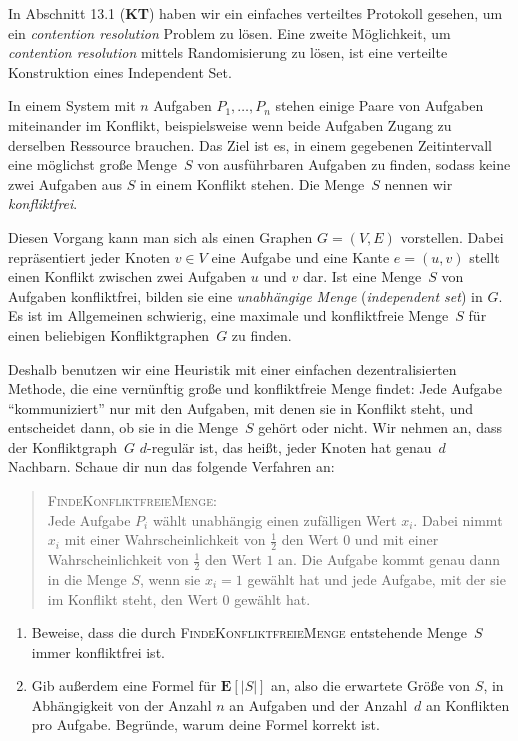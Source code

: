 \documentclass{uebung_cs}
\begin{document}
\begin{exercise}
	In Abschnitt 13.1 (\textbf{KT}) haben wir ein einfaches verteiltes Protokoll gesehen, um ein \textit{contention resolution} Problem zu lösen. Eine zweite Möglichkeit, um \textit{contention resolution} mittels Randomisierung zu lösen, ist eine verteilte Konstruktion eines Independent Set.

	In einem System mit $n$ Aufgaben $P_1,\dots,P_n$ stehen einige Paare von Aufgaben miteinander im Konflikt, beispielsweise wenn beide Aufgaben Zugang zu derselben Ressource brauchen. Das Ziel ist es, in einem gegebenen Zeitintervall eine möglichst große Menge~$S$ von ausführbaren Aufgaben zu finden, sodass keine zwei Aufgaben aus $S$ in einem Konflikt stehen. Die Menge~$S$ nennen wir \textit{konfliktfrei}.
	
	Diesen Vorgang kann man sich als einen Graphen $G = (V,E)$ vorstellen. Dabei repräsentiert jeder Knoten $v \in V$ eine Aufgabe und eine Kante $e = (u,v)$ stellt einen Konflikt zwischen zwei Aufgaben $u$ und $v$ dar. Ist eine Menge~$S$ von Aufgaben konfliktfrei, bilden sie eine \emph{unabhängige Menge} (\emph{independent set}) in $G$. 
	Es ist im Allgemeinen schwierig, eine maximale und konfliktfreie Menge~$S$ für einen beliebigen Konfliktgraphen~$G$ zu finden.
	
	Deshalb benutzen wir eine Heuristik mit einer einfachen dezentralisierten Methode, die eine vernünftig große und konfliktfreie Menge findet: Jede Aufgabe \enquote{kommuniziert} nur mit den Aufgaben, mit denen sie in Konflikt steht, und entscheidet dann, ob sie in die Menge~$S$ gehört oder nicht.
	Wir nehmen an, dass der Konfliktgraph~$G$ $d$-regulär ist, das heißt, jeder Knoten hat genau~$d$ Nachbarn. Schaue dir nun das folgende Verfahren an:
	
	\begin{quote}
		\textsc{FindeKonfliktfreieMenge}: \\
		Jede Aufgabe $P_i$ wählt unabhängig einen zufälligen Wert $x_i$. Dabei nimmt $x_i$ mit einer Wahrscheinlichkeit von $\frac{1}{2}$ den Wert $0$ und mit einer Wahrscheinlichkeit von $\frac{1}{2}$ den Wert $1$ an. Die Aufgabe kommt genau dann in die Menge $S$, wenn sie $x_i = 1$ gewählt hat und jede Aufgabe, mit der sie im Konflikt steht, den Wert $0$ gewählt hat.
	\end{quote}
	
		\begin{enumerate}
		\item\medium Beweise, dass die durch \textsc{FindeKonfliktfreieMenge} entstehende Menge~$S$ immer konfliktfrei ist.
		\item\hard Gib außerdem eine Formel für $\mathbf{E}[|S|]$ an, also die erwartete Größe von $S$, in Abhängigkeit von der Anzahl $n$ an Aufgaben und der Anzahl~$d$ an Konflikten pro Aufgabe. Begründe, warum deine Formel korrekt ist.
	\end{enumerate}
\end{exercise}
\end{document}
